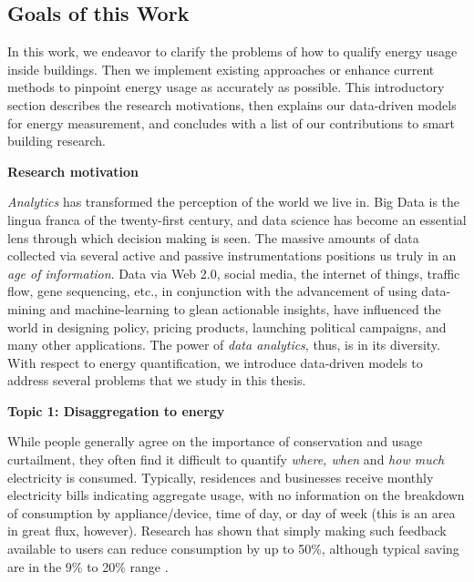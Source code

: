 
\subsection{Goals of this Work}
In this work, we endeavor to clarify the problems of how to qualify energy usage inside buildings. Then we implement existing approaches or enhance current methods to pinpoint energy usage as accurately as possible. This introductory section describes the research motivations, then explains our data-driven models for energy measurement, and concludes with a list of our contributions to smart building research. 

\textbf{Research motivation}

\emph{Analytics} has transformed the perception of the world we live in. Big Data is the lingua franca of the twenty-first century, and data science has become an essential lens through which decision making is seen. The massive amounts of data collected via several active and passive instrumentations positions us truly in an \emph{age of information}. Data via Web 2.0, social media, the internet of things, traffic flow, gene sequencing, etc., in conjunction with the advancement of using data-mining and machine-learning to glean actionable insights, have influenced the world in designing policy, pricing products, launching political campaigns, and many other applications. The power of \emph{data analytics}, thus, is in its diversity. 
With respect to energy quantification, we introduce data-driven models to address several problems that we study in this thesis. 

\textbf{Topic 1: Disaggregation to energy}

While people generally agree on the importance of conservation and
usage curtailment, they often find it difficult to quantify 
{\em where, when} and {\em how much} electricity is consumed.
Typically, residences and businesses receive
monthly electricity bills indicating aggregate usage, with no information on
the breakdown of consumption by appliance/device, time of day, or day of
week (this is an area in great flux, however). Research has 
shown that simply making such feedback available to users
can reduce consumption by up to 50\%, although typical saving 
are in the 9\% to 20\% range \cite{book2014us}.%

